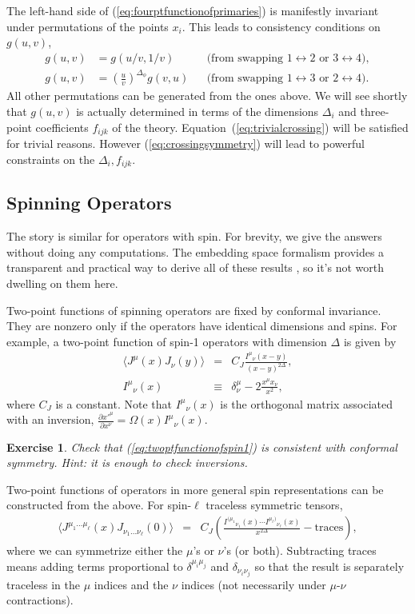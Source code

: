 \documentclass[11pt]{ws-rv9x6}
\newcommand\be{\begin{eqnarray}}
\newcommand\ee{\end{eqnarray}}
\newcommand\f\phi
\newcommand\p[1]{\left(#1\right)}
\newcommand\<\langle
\renewcommand\>\rangle
\newcommand\de\delta
\renewcommand\.{\cdot}
\newcommand\pdr[2]{\frac{\partial #1}{\partial #2}}
\newcommand\De{\Delta}
\newtheorem{exercise}{Exercise}[section]
\begin{document}
The left-hand side of (\ref{eq:fourptfunctionofprimaries}) is manifestly invariant under permutations of the points $x_i$.  This leads to consistency conditions on $g(u,v)$,
\begin{align}
\label{eq:trivialcrossing}
g(u,v) &= g(u/v,1/v) && \textrm{(from swapping $1\leftrightarrow 2$ or $3\leftrightarrow 4$)},\\
\label{eq:crossingsymmetry}
g(u,v) &= \p{\frac{u}{v}}^{\De_\f} g(v,u) && \textrm{(from swapping $1\leftrightarrow 3$ or $2\leftrightarrow 4$)}.
\end{align}
All other permutations can be generated from the ones above.  We will see shortly that $g(u,v)$ is  actually determined in terms of the dimensions $\De_i$ and three-point coefficients $f_{ijk}$ of the theory.  Equation~(\ref{eq:trivialcrossing}) will be satisfied for trivial reasons.  However (\ref{eq:crossingsymmetry}) will lead to powerful constraints on the $\De_i, f_{ijk}$.

\subsection{Spinning Operators}

The story is similar for operators with spin.  For brevity, we give the answers without doing any computations.  The embedding space formalism provides a transparent and practical way to derive all of these results \cite{Costa:2011mg}, so it's not worth dwelling on them here.

Two-point functions of spinning operators are fixed by conformal invariance.  They are nonzero only if the operators have identical dimensions and spins.  For example, a two-point function of spin-1 operators with dimension $\Delta$ is given by
\be
\label{eq:twoptfunctionofspin1}
\<J^\mu(x)J_\nu(y)\> &=& C_J \frac{I^\mu{}_{\nu}(x-y)}{(x-y)^{2\De}},\\
 I^{\mu}{}_{\nu}(x)&\equiv& \de^\mu_\nu-2\frac{x^\mu x_\nu}{x^2},
 \label{eq:Itensor}
\ee
where $C_J$ is a constant. Note that $I^\mu{}_{\nu}(x)$ is the orthogonal matrix associated with an inversion, $\pdr{x'^\mu}{x^\nu}=\Omega(x) I^\mu{}_\nu(x)$.
\begin{exercise}
Check that (\ref{eq:twoptfunctionofspin1}) is consistent with conformal symmetry.  Hint: it is enough to check inversions.
\end{exercise}

Two-point functions of operators in more general spin representations can be constructed from the above.  For spin-$\ell$ traceless symmetric tensors,
\be
\label{eq:twopointfunctionofspinL}
\<J^{\mu_1\dots\mu_\ell}(x)J_{\nu_1\dots\nu_\ell}(0)\> &=& C_J \p{\frac{I^{(\mu_1}{}_{\nu_1}(x)\cdots I^{\mu_\ell)}{}_{\nu_\ell}(x)}{x^{2\De}} - \mathrm{traces}},
\ee
where we can symmetrize either the $\mu$'s or $\nu$'s (or both).  Subtracting traces means adding terms proportional to $\de^{\mu_i\mu_j}$ and $\de_{\nu_i\nu_j}$ so that the result is separately traceless in the $\mu$ indices and the $\nu$ indices (not necessarily under $\mu$-$\nu$ contractions).
\end{document}
